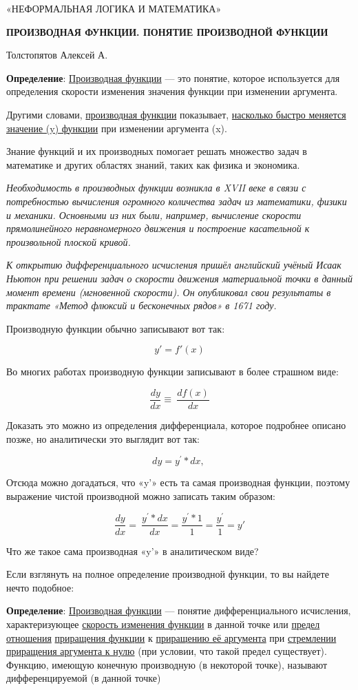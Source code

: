 \documentclass[
]{article}
\author{}
\date{}
\begin{document}
«НЕФОРМАЛЬНАЯ ЛОГИКА И МАТЕМАТИКА»

\textbf{ПРОИЗВОДНАЯ ФУНКЦИИ. ПОНЯТИЕ ПРОИЗВОДНОЙ ФУНКЦИИ}

Толстопятов Алексей А.

\textbf{Определение}: \uline{Производная функции} --- это понятие,
которое используется для определения скорости изменения значения функции
при изменении аргумента.

Другими словами, \uline{производная функции} показывает,
\uline{насколько быстро меняется значение (y) функции} при изменении
аргумента (x).

Знание функций и их производных помогает решать множество задач в
математике и других областях знаний, таких как физика и экономика.

\emph{Необходимость в производных функции возникла в XVII веке в связи с
потребностью вычисления огромного количества задач из математики, физики
и механики. Основными из них были, например, вычисление скорости
прямолинейного неравномерного движения и построение касательной к
произвольной плоской кривой.}

\emph{К открытию дифференциального исчисления пришёл английский учёный
Исаак Ньютон при решении задач о скорости движения материальной точки в
данный момент времени (мгновенной скорости). Он опубликовал свои
результаты в трактате «Метод флюксий и бесконечных рядов» в 1671 году.}

Производную функции обычно записывают вот так:

\[y' = f'(x)\]

Во многих работах производную функции записывают в более страшном виде:

\[\frac{dy}{dx} \equiv \ \frac{df(x)}{dx}\]

Доказать это можно из определения дифференциала, которое подробнее
описано позже, но аналитически это выглядит вот так:

\[dy = y^{'}*dx,\ \]

Отсюда можно догадаться, что «y'» есть та самая производная функции,
поэтому выражение чистой производной можно записать таким образом:

\[\frac{dy}{dx} = \ \frac{y^{'}*dx}{dx} = \frac{y^{'}*1}{1} = \frac{y^{'}}{1} = y'\]

Что же такое сама производная «y'» в аналитическом виде?

Если взглянуть на полное определение производной функции, то вы найдете
нечто подобное:

\textbf{Определение}: \uline{Производная функции} --- понятие
дифференциального исчисления, характеризующее \uline{скорость изменения
функции} в данной точке или \uline{предел отношения} \uline{приращения
функции} к \uline{приращению её аргумента} при \uline{стремлении
приращения аргумента к нулю} (при условии, что такой предел существует).
Функцию, имеющую конечную производную (в некоторой точке), называют
дифференцируемой (в данной точке)
\end{document}
